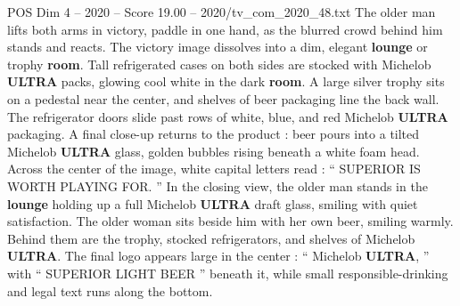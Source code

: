 \begin{textsample}{POS Dim 4 – 2020 – Score 19.00 – 2020/tv\_com\_2020\_48.txt}
The older man lifts both arms in victory, paddle in one hand, as the blurred crowd behind him stands and reacts.
The victory image dissolves into a dim, elegant \textbf{lounge} or trophy \textbf{room}.
Tall refrigerated cases on both sides are stocked with Michelob \textbf{ULTRA} packs, glowing cool white in the dark \textbf{room}.
A large silver trophy sits on a pedestal near the center, and shelves of beer packaging line the back wall.
The refrigerator doors slide past rows of white, blue, and red Michelob \textbf{ULTRA} packaging.
A final close-up returns to the product : beer pours into a tilted Michelob \textbf{ULTRA} glass, golden bubbles rising beneath a white foam head.
Across the center of the image, white capital letters read : “ SUPERIOR IS WORTH PLAYING FOR. ” In the closing view, the older man stands in the \textbf{lounge} holding up a full Michelob \textbf{ULTRA} draft glass, smiling with quiet satisfaction.
The older woman sits beside him with her own beer, smiling warmly.
Behind them are the trophy, stocked refrigerators, and shelves of Michelob \textbf{ULTRA}.
The final logo appears large in the center : “ Michelob \textbf{ULTRA}, ” with “ SUPERIOR LIGHT BEER ” beneath it, while small responsible-drinking and legal text runs along the bottom.

\end{textsample}
